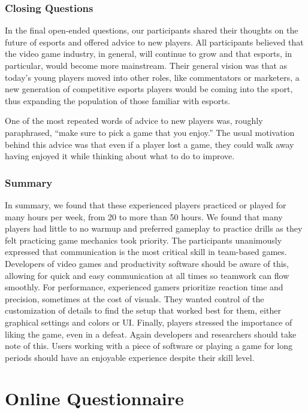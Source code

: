 \documentclass[11pt,manuscript,screen,review]{acmart} %
\begin{document}
\subsubsection{Closing Questions}

In the final open-ended questions, our participants shared their thoughts on the future of esports and offered advice to new players. All participants believed that the video game industry, in general, will continue to grow and that esports, in particular, would become more mainstream. Their general vision was that as today’s young players moved into other roles, like commentators or marketers, a new generation of competitive esports players would be coming into the sport, thus expanding the population of those familiar with esports. 

One of the most repeated words of advice to new players was, roughly paraphrased, “make sure to pick a game that you enjoy.” The usual motivation behind this advice was that even if a player lost a game, they could walk away having enjoyed it while thinking about what to do to improve.

\subsubsection{Summary}

In summary, we found that these experienced players practiced or played for many hours per week, from 20 to more than 50 hours. We found that many players had little to no warmup and preferred gameplay to practice drills as they felt practicing game mechanics took priority. The participants unanimously expressed that communication is the most critical skill in team-based games. Developers of video games and productivity software should be aware of this, allowing for quick and easy communication at all times so teamwork can flow smoothly. For performance, experienced gamers prioritize reaction time and precision, sometimes at the cost of visuals. They wanted control of the customization of details to find the setup that worked best for them, either graphical settings and colors or UI. Finally, players stressed the importance of liking the game, even in a defeat. Again developers and researchers should take note of this. Users working with a piece of software or playing a game for long periods should have an enjoyable experience despite their skill level. 

\section{Online Questionnaire}
\end{document}
